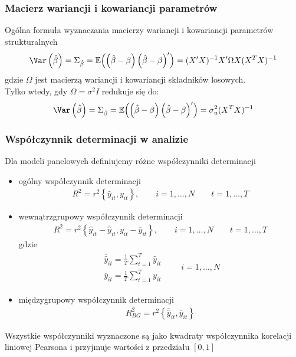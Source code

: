 \subsubsection{Macierz wariancji i kowariancji parametrów}
Ogólna formuła wyznaczania macierzy wariancji i kowariancji parametrów strukturalnych
\begin{gather*}
\Var\left(\hat{\beta }\right)=
\Sigma_{\hat{\beta}}=
\mathbb E \Bigl(\left(\hat{\beta}-\beta\right)\left(\hat{\beta}-\beta\right)'\Bigr)
=(X'X)^{-1}X'\Omega X(X^TX)^{-1}
\end{gather*}
gdzie $ \Omega $ jest macierzą wariancji i kowariancji składników losowych.\\
Tylko wtedy, gdy $ \Omega=\sigma^2I $ redukuje się do:
\begin{gather*}
\Var\left(\hat{\beta }\right)=
\Sigma_{\hat{\beta}}=
\mathbb E \Bigl(\left(\hat{\beta}-\beta\right)\left(\hat{\beta}-\beta\right)'\Bigr)
=\sigma_u^2(X^TX)^{-1}
\end{gather*}
\subsubsection{Współczynnik determinacji w analizie}
Dla modeli panelowych definiujemy różne współczynniki determinacji
\begin{itemize}
\item ogólny współczynnik determinacji
\begin{gather*}
R^2=r^2\left\{\hat{y}_{it},y_{it}\right\},\qquad i=1,\dots,N\qquad t=1,\dots,T
\end{gather*}
\item wewnątrzgrupowy współczynnik determinacji
\begin{gather*}
R^2=r^2\left\{\hat{y}_{it}-\overline{\hat{y}}_{it},y_{it}-\overline{y}_{it}\right\},\qquad i=1,\dots,N\qquad t=1,\dots,T
\end{gather*}
gdzie
\begin{gather*}
\begin{array}{l}
\overline{\hat{y}}_{it}=\frac{1}{T}\sum\limits_{t=1}^{T}\hat y_{it}\\
\overline{{y}}_{it}=\frac{1}{T}\sum\limits_{t=1}^{T} y_{it}
\end{array}
\qquad i=1,\dots,N
\end{gather*}
\item międzygrupowy współczynnik determinacji
\begin{gather*}
R^2_{BG}=r^2\left\{\overline{\hat{y}}_{it},\overline y_{it}\right\}
\end{gather*}
\end{itemize}
Wszystkie współczynniki wyznaczone są jako kwadraty współczynnika korelacji liniowej Pearsona i przyjmuje wartości z przedziału $ [0,1] $

